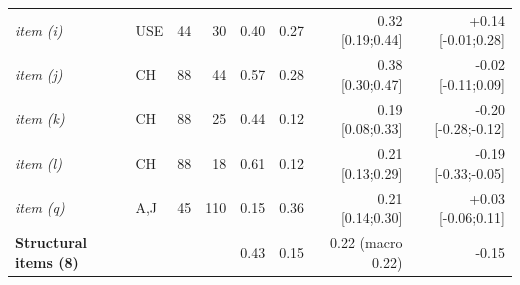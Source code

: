 \begin{table}[t]
\begin{tabular}{@{}llrrrrrr@{}}
\emph{item (i)} & USE & 44 & 30 & 0.40 & 0.27 & 0.32 [0.19;0.44] & +0.14 [-0.01;0.28] \\
\emph{item (j)} & CH & 88 & 44 & 0.57 & 0.28 & 0.38 [0.30;0.47] & -0.02 [-0.11;0.09] \\
\emph{item (k)} & CH & 88 & 25 & 0.44 & 0.12 & 0.19 [0.08;0.33] & -0.20 [-0.28;-0.12] \\
\emph{item (l)} & CH & 88 & 18 & 0.61 & 0.12 & 0.21 [0.13;0.29] & -0.19 [-0.33;-0.05] \\
\emph{item (q)} & A,J & 45 & 110 & 0.15 & 0.36 & 0.21 [0.14;0.30] & +0.03 [-0.06;0.11] \\
\midrule
\textbf{Structural items (8)} & & & & 0.43 & 0.15 & 0.22 (macro 0.22) & -0.15 \\
\bottomrule
\end{tabular}
\end{table}
